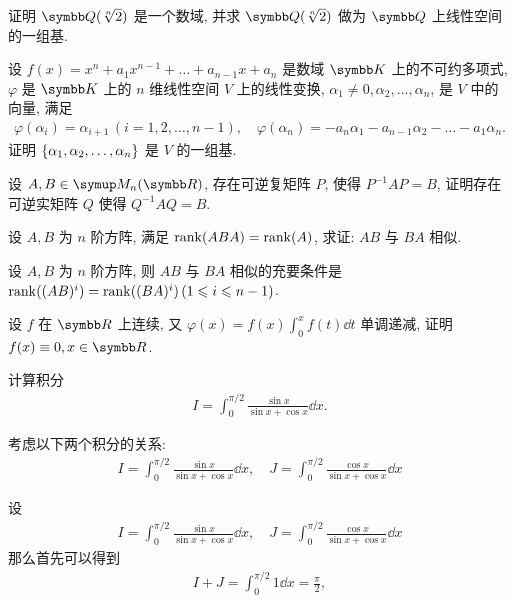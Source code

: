 \documentclass{ctexart}
\begin{document}
\begin{exercise}[series=exer]
    证明 $ \Q(\sqrt[n]{2}) $ 是一个数域, 并求 $ \Q(\sqrt[n]{2}) $ 做为 $ \Q $ 上线性空间的一组基.
    \item 设 $ f(x) = x^{n} + a_{1}x^{n-1} + \dots + a_{n-1}x + a_{n} $ 是数域 $ \K $ 上的不可约多项式, $ \varphi $ 是 $ \K $ 上的 $ n $ 维线性空间 $ V $ 上的线性变换, $ \alpha_{1} \ne 0, \alpha_{2}, \dots, \alpha_{n} $, 是 $ V $ 中的向量, 满足 
    \begin{align*}
        \varphi(\alpha_{i}) = \alpha_{i + 1}\,(i = 1, 2, \dots, n-1), \quad \varphi(\alpha_{n}) = -a_{n}\alpha_{1} - a_{n-1}\alpha_{2} - \dots - a_{1}\alpha_{n}.
    \end{align*}
    证明 $ \qty{\alpha_{1}, \alpha_{2}, \dots, \alpha_{n}} $ 是 $ V $ 的一组基. 
    \item\label{item:CtoR} 设 $ A, B \in \MM $, 存在可逆复矩阵 $ P $, 使得 $ P^{-1}AP = B $, 证明存在可逆实矩阵 $ Q $ 使得 $ Q^{-1}AQ = B $.   
    \item 设 $ A, B $ 为 $ n $ 阶方阵, 满足 $ \rank(ABA) = \rank(A) $, 求证: $ AB $ 与 $ BA $ 相似.
    \item 设 $ A, B $ 为 $ n $ 阶方阵, 则 $ AB $ 与 $ BA $ 相似的充要条件是 $ \rank((AB)^{i}) = \rank((BA)^{i})\,(1 \leqslant i \leqslant n - 1) $.
    \item 设 $ f $ 在 $ \R $ 上连续, 又 $ \varphi(x) = f(x)\int_{0}^{x} f(t) \dd{t} $ 单调递减, 证明 $ f(x) \equiv 0, x\in\R $.
    \item 计算积分
    \begin{align*}
        I = \int_{0}^{\pi/2} \frac{\sin x}{\sin x + \cos x} \dd{x}.
    \end{align*}
    \begin{hint}
        考虑以下两个积分的关系:
        \begin{align*}
            I = \int_{0}^{\pi/2} \frac{\sin x}{\sin x + \cos x} \dd{x}, \quad J = \int_{0}^{\pi/2} \frac{\cos x}{\sin x + \cos x} \dd{x}
        \end{align*}
    \end{hint}
    \begin{answer}
        设 
        \begin{align*}
            I = \int_{0}^{\pi/2} \frac{\sin x}{\sin x + \cos x} \dd{x}, \quad J = \int_{0}^{\pi/2} \frac{\cos x}{\sin x + \cos x} \dd{x}
        \end{align*}
        那么首先可以得到 
        \begin{align*}
            I + J = \int_{0}^{\pi/2} 1\dd{x} = \frac{\pi}{2},
        \end{align*}

\end{answer}
\end{exercise}
\end{document}
